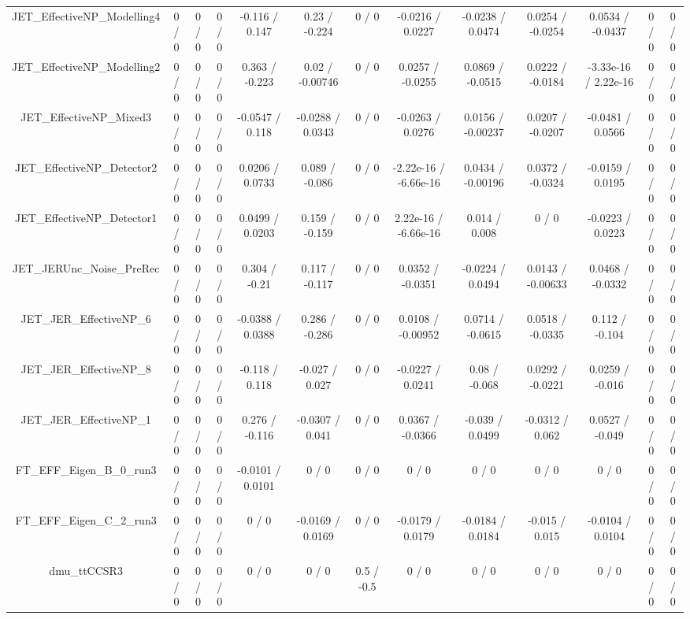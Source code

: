 \documentclass[10pt]{article}
\begin{document}
\begin{table}[htbp]
\begin{center}
\begin{tabular}{|c|c|c|c|c|c|c|c|c|c|c|c|c|}
  JET_EffectiveNP_Modelling4 & 0 / 0 & 0 / 0 & 0 / 0 & -0.116 / 0.147 & 0.23 / -0.224 & 0 / 0 & -0.0216 / 0.0227 & -0.0238 / 0.0474 & 0.0254 / -0.0254 & 0.0534 / -0.0437 & 0 / 0 & 0 / 0 \\ 
  JET_EffectiveNP_Modelling2 & 0 / 0 & 0 / 0 & 0 / 0 & 0.363 / -0.223 & 0.02 / -0.00746 & 0 / 0 & 0.0257 / -0.0255 & 0.0869 / -0.0515 & 0.0222 / -0.0184 & -3.33e-16 / 2.22e-16 & 0 / 0 & 0 / 0 \\ 
  JET_EffectiveNP_Mixed3 & 0 / 0 & 0 / 0 & 0 / 0 & -0.0547 / 0.118 & -0.0288 / 0.0343 & 0 / 0 & -0.0263 / 0.0276 & 0.0156 / -0.00237 & 0.0207 / -0.0207 & -0.0481 / 0.0566 & 0 / 0 & 0 / 0 \\ 
  JET_EffectiveNP_Detector2 & 0 / 0 & 0 / 0 & 0 / 0 & 0.0206 / 0.0733 & 0.089 / -0.086 & 0 / 0 & -2.22e-16 / -6.66e-16 & 0.0434 / -0.00196 & 0.0372 / -0.0324 & -0.0159 / 0.0195 & 0 / 0 & 0 / 0 \\ 
  JET_EffectiveNP_Detector1 & 0 / 0 & 0 / 0 & 0 / 0 & 0.0499 / 0.0203 & 0.159 / -0.159 & 0 / 0 & 2.22e-16 / -6.66e-16 & 0.014 / 0.008 & 0 / 0 & -0.0223 / 0.0223 & 0 / 0 & 0 / 0 \\ 
  JET_JERUnc_Noise_PreRec & 0 / 0 & 0 / 0 & 0 / 0 & 0.304 / -0.21 & 0.117 / -0.117 & 0 / 0 & 0.0352 / -0.0351 & -0.0224 / 0.0494 & 0.0143 / -0.00633 & 0.0468 / -0.0332 & 0 / 0 & 0 / 0 \\ 
  JET_JER_EffectiveNP_6 & 0 / 0 & 0 / 0 & 0 / 0 & -0.0388 / 0.0388 & 0.286 / -0.286 & 0 / 0 & 0.0108 / -0.00952 & 0.0714 / -0.0615 & 0.0518 / -0.0335 & 0.112 / -0.104 & 0 / 0 & 0 / 0 \\ 
  JET_JER_EffectiveNP_8 & 0 / 0 & 0 / 0 & 0 / 0 & -0.118 / 0.118 & -0.027 / 0.027 & 0 / 0 & -0.0227 / 0.0241 & 0.08 / -0.068 & 0.0292 / -0.0221 & 0.0259 / -0.016 & 0 / 0 & 0 / 0 \\ 
  JET_JER_EffectiveNP_1 & 0 / 0 & 0 / 0 & 0 / 0 & 0.276 / -0.116 & -0.0307 / 0.041 & 0 / 0 & 0.0367 / -0.0366 & -0.039 / 0.0499 & -0.0312 / 0.062 & 0.0527 / -0.049 & 0 / 0 & 0 / 0 \\ 
  FT_EFF_Eigen_B_0_run3 & 0 / 0 & 0 / 0 & 0 / 0 & -0.0101 / 0.0101 & 0 / 0 & 0 / 0 & 0 / 0 & 0 / 0 & 0 / 0 & 0 / 0 & 0 / 0 & 0 / 0 \\ 
  FT_EFF_Eigen_C_2_run3 & 0 / 0 & 0 / 0 & 0 / 0 & 0 / 0 & -0.0169 / 0.0169 & 0 / 0 & -0.0179 / 0.0179 & -0.0184 / 0.0184 & -0.015 / 0.015 & -0.0104 / 0.0104 & 0 / 0 & 0 / 0 \\ 
  dmu_ttCCSR3 & 0 / 0 & 0 / 0 & 0 / 0 & 0 / 0 & 0 / 0 & 0.5 / -0.5 & 0 / 0 & 0 / 0 & 0 / 0 & 0 / 0 & 0 / 0 & 0 / 0 \\ 

\end{tabular}
\end{center}
\end{table}
\end{document}
